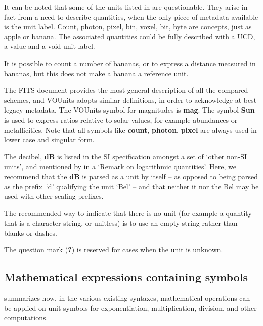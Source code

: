 \documentclass[11pt,notitlepage,onecolumn]{ivoa}
\newcommand{\unit}[1]{\textbf{\textsf{\color{orange}#1}}}
\begin{document}
It can be noted that some of the units listed in  are 
questionable. They arise in fact from a need to describe quantities, when the only
piece of metadata available is the unit label. Count, photon, pixel, bin, voxel, bit,
byte are concepts, just as apple or banana. The associated quantities could be fully
described with a UCD, a value and a void unit label.

It is possible to count a number of bananas, or to express a distance measured in
bananas, but this does not make a banana a reference unit.

The FITS document provides the most general description of all the compared schemes, 
and VOUnits adopts similar definitions, in order to acknowledge at best legacy metadata.
The VOUnits symbol for magnitudes is \unit{mag}.
The symbol \unit{Sun} is used to express ratios relative to solar values, for example
abundances or metallicities.
Note that all symbols like \unit{count}, \unit{photon}, \unit{pixel} are always used
in lower case and singular form.

The decibel, \unit{dB} is listed in the SI specification \citep[Table
8]{si-brochure} amongst a set of `other non-SI units', and mentioned
by \citet[\S0.5]{std:iso80000-3} in a `Remark on logarithmic
quantities'.  Here, we recommend that the \unit{dB} is parsed as a
unit by itself -- as opposed to being parsed as the prefix~`d' qualifying the unit `Bel' --
and that neither it nor the Bel may be used with other scaling prefixes.

The recommended way to indicate that there is no unit (for example a quantity that
is a character string, or unitless) is to use an empty string rather than blanks
or dashes.

The question mark (\unit{?}) is reserved for cases when the unit is unknown.


\subsection{Mathematical expressions containing symbols}

 summarizes how, 
in the various existing syntaxes,
mathematical operations can be applied on unit symbols for
exponentiation, multiplication, division, and other computations.
\end{document}
